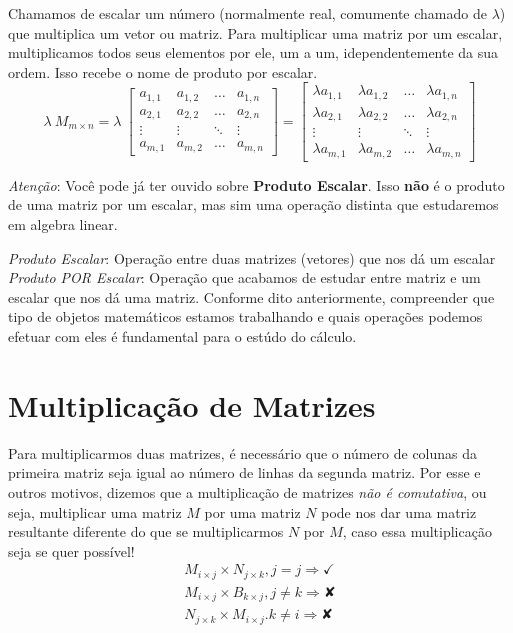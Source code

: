 \documentclass[
  portuguese,
  letterpaper,
  DIV=11,
  numbers=noendperiod]{scrreport}
\begin{document}
Chamamos de escalar um número (normalmente real, comumente chamado de
\(\lambda\)) que multiplica um vetor ou matriz. Para multiplicar uma
matriz por um escalar, multiplicamos todos seus elementos por ele, um a
um, idependentemente da sua ordem. Isso recebe o nome de produto por
escalar. \[
\lambda~ M_{m\times n}=
\lambda~
\begin{bmatrix}
    a_{1,1} & a_{1,2} & \dots & a_{1,n} \\
    a_{2,1} & a_{2,2} & \dots & a_{2,n} \\
    \vdots  & \vdots & \ddots & \vdots \\
    a_{m,1} & a_{m,2} & \dots & a_{m,n}
\end{bmatrix}
=
\begin{bmatrix}
    \lambda a_{1,1} & \lambda a_{1,2} & \dots & \lambda a_{1,n} \\
    \lambda a_{2,1} & \lambda a_{2,2} & \dots & \lambda a_{2,n} \\
    \vdots  & \vdots & \ddots & \vdots \\
    \lambda a_{m,1} & \lambda a_{m,2} & \dots & \lambda a_{m,n}
\end{bmatrix}
\]

\emph{Atenção}: Você pode já ter ouvido sobre \textbf{Produto Escalar}.
Isso \textbf{não} é o produto de uma matriz por um escalar, mas sim uma
operação distinta que estudaremos em algebra linear.

\emph{Produto Escalar}: Operação entre duas matrizes (vetores) que nos
dá um escalar \emph{Produto POR Escalar}: Operação que acabamos de
estudar entre matriz e um escalar que nos dá uma matriz. Conforme dito
anteriormente, compreender que tipo de objetos matemáticos estamos
trabalhando e quais operações podemos efetuar com eles é fundamental
para o estúdo do cálculo.

\section{Multiplicação de
Matrizes}\label{multiplicauxe7uxe3o-de-matrizes}

Para multiplicarmos duas matrizes, é necessário que o número de colunas
da primeira matriz seja igual ao número de linhas da segunda matriz. Por
esse e outros motivos, dizemos que a multiplicação de matrizes \emph{não
é comutativa}, ou seja, multiplicar uma matriz \(M\) por uma matriz
\(N\) pode nos dar uma matriz resultante diferente do que se
multiplicarmos \(N\) por \(M\), caso essa multiplicação seja se quer
possível! \[
\begin{aligned}
    M_{i\times j} \times N_{j\times k}, j=j \Rightarrow \checkmark \\
    M_{i\times j} \times B_{k\times j}, j\neq k \Rightarrow ✘ \\
    N_{j\times k} \times M_{i\times j}. k\neq i \Rightarrow ✘
\end{aligned}
\]
\end{document}
